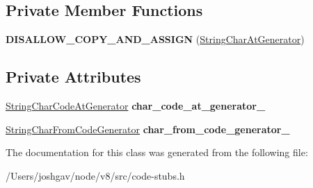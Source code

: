 \subsection*{Private Member Functions}
\begin{DoxyCompactItemize}
\item 
{\bfseries D\+I\+S\+A\+L\+L\+O\+W\+\_\+\+C\+O\+P\+Y\+\_\+\+A\+N\+D\+\_\+\+A\+S\+S\+I\+GN} (\hyperlink{classv8_1_1internal_1_1_string_char_at_generator}{String\+Char\+At\+Generator})\hypertarget{classv8_1_1internal_1_1_string_char_at_generator_a0935d5d9ce40e9d758f0647fd8caec65}{}\label{classv8_1_1internal_1_1_string_char_at_generator_a0935d5d9ce40e9d758f0647fd8caec65}

\end{DoxyCompactItemize}
\subsection*{Private Attributes}
\begin{DoxyCompactItemize}
\item 
\hyperlink{classv8_1_1internal_1_1_string_char_code_at_generator}{String\+Char\+Code\+At\+Generator} {\bfseries char\+\_\+code\+\_\+at\+\_\+generator\+\_\+}\hypertarget{classv8_1_1internal_1_1_string_char_at_generator_aed1fce022d4ff6c26c028a438e24e574}{}\label{classv8_1_1internal_1_1_string_char_at_generator_aed1fce022d4ff6c26c028a438e24e574}

\item 
\hyperlink{classv8_1_1internal_1_1_string_char_from_code_generator}{String\+Char\+From\+Code\+Generator} {\bfseries char\+\_\+from\+\_\+code\+\_\+generator\+\_\+}\hypertarget{classv8_1_1internal_1_1_string_char_at_generator_a18193140522ea477a38c5a48ea0493f9}{}\label{classv8_1_1internal_1_1_string_char_at_generator_a18193140522ea477a38c5a48ea0493f9}

\end{DoxyCompactItemize}


The documentation for this class was generated from the following file\+:\begin{DoxyCompactItemize}
\item 
/\+Users/joshgav/node/v8/src/code-\/stubs.\+h\end{DoxyCompactItemize}
